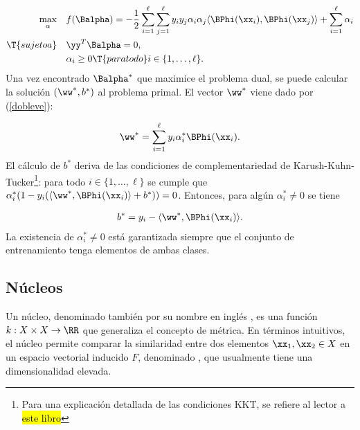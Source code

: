 \begin{align}
  \begin{split}
    \max_\alpha &\quad f(\Balpha) =
    -\frac{1}{2}\sum_{i=1}^\ell\sum_{j=1}^\ell y_iy_j\alpha_i\alpha_j
    \langle \BPhi(\xx_i),\BPhi(\xx_j) \rangle +
    \sum_{i=1}^{\ell} \alpha_i \\
    \T{sujeto a} &\quad \yy^T\Balpha = 0, \\
    &\quad \alpha_i \geq 0\T{ para todo } i\in\{1,\ldots,\ell\}.
  \end{split}
  \label{prob2}
\end{align}
Una vez encontrado $\Balpha^*$ que maximice el problema dual, se puede
calcular la solución $(\ww^*,b^*)$ al problema primal.  El vector
$\ww^*$ viene dado por (\autoref{dobleve}):

\begin{align*}
  \ww^* = \sum_{i=1}^\ell y_i\alpha^*_i\BPhi(\xx_i).
\end{align*}
El cálculo de $b^*$ deriva de las condiciones de complementariedad de
Karush-Kuhn-Tucker\footnote{Para una explicación detallada de las
  condiciones KKT, se refiere al lector a \hl{este libro}}: para todo
$i\in\{1,\ldots,\ell\}$ se cumple que
$\alpha^*_i(1-y_i(\langle\ww^*,\BPhi(\xx_i)\rangle+b^*))=0$. Entonces,
para algún $\alpha^*_i\neq0$ se tiene

\begin{align}
  b^* = y_i - \langle\ww^*,\BPhi(\xx_i)\rangle .
\end{align}
La existencia de $\alpha^*_i\neq0$ está garantizada siempre que el
conjunto de entrenamiento tenga elementos de ambas clases.

\subsection{Núcleos}
Un núcleo, denominado también por su nombre en inglés , es
una función $k:X\times{}X\rightarrow{}\RR$ \cite{stewart} que
generaliza el concepto de métrica. En términos intuitivos, el núcleo
permite comparar la similaridad entre dos elementos
$\xx_1,\xx_2\in{}X$ en un espacio vectorial inducido $F$, denominado
, que usualmente tiene una dimensionalidad elevada.

